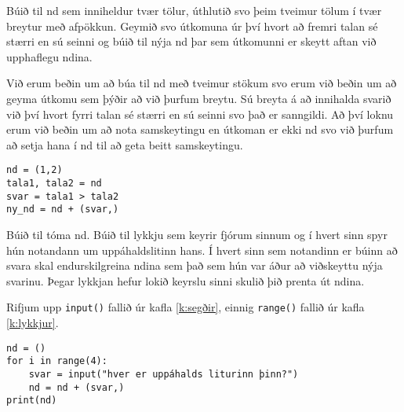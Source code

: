\begin{exercise}\label{nd3}
Búið til nd sem inniheldur tvær tölur, úthlutið svo þeim tveimur tölum í tvær breytur með afpökkun.
Geymið svo útkomuna úr því hvort að fremri talan sé stærri en sú seinni og búið til nýja nd þar sem útkomunni er skeytt aftan við upphaflegu ndina.
\end{exercise}
\begin{Answer}[ref={nd3}]
Við erum beðin um að búa til nd með tveimur stökum svo erum við beðin um að geyma útkomu sem þýðir að við þurfum breytu.
Sú breyta á að innihalda svarið við því hvort fyrri talan sé stærri en sú seinni svo það er sanngildi.
Að því loknu erum við beðin um að nota samskeytingu en útkoman er ekki nd svo við þurfum að setja hana í nd til að geta beitt samskeytingu.
	\begin{lstlisting}
nd = (1,2)
tala1, tala2 = nd
svar = tala1 > tala2
ny_nd = nd + (svar,)\end{lstlisting}
\end{Answer}

\begin{exercise}\label{nd4}
Búið til tóma nd.
Búið til lykkju sem keyrir fjórum sinnum og í hvert sinn spyr hún notandann um uppáhaldslitinn hans.
Í hvert sinn sem notandinn er búinn að svara skal endurskilgreina ndina sem það sem hún var áður að viðskeyttu nýja svarinu.
Þegar lykkjan hefur lokið keyrslu sinni skulið þið prenta út ndina.
\end{exercise}
\begin{Answer}[ref={nd4}]
Rifjum upp  \texttt{input()} fallið úr kafla \ref{k:segðir}, einnig \texttt{range()} fallið úr kafla \ref{k:lykkjur}.
\begin{lstlisting}
nd = ()
for i in range(4):
	svar = input("hver er uppáhalds liturinn þinn?")
	nd = nd + (svar,)
print(nd)\end{lstlisting}
\newpage
\end{Answer}